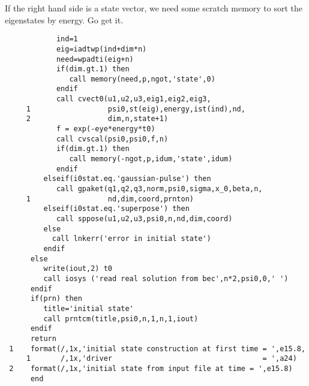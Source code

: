 \documentclass{article}
\begin{document}
        If the right hand side is a state vector, we need some scratch
        memory to sort the eigenstates by energy.  Go get it.
\begin{verbatim}
            ind=1
            eig=iadtwp(ind+dim*n)
            need=wpadti(eig+n)
            if(dim.gt.1) then
               call memory(need,p,ngot,'state',0)
            endif
            call cvect0(u1,u2,u3,eig1,eig2,eig3,
     1                  psi0,st(eig),energy,ist(ind),nd,
     2                  dim,n,state+1)
            f = exp(-eye*energy*t0)
            call cvscal(psi0,psi0,f,n)
            if(dim.gt.1) then
               call memory(-ngot,p,idum,'state',idum)
            endif
         elseif(i0stat.eq.'gaussian-pulse') then
            call gpaket(q1,q2,q3,norm,psi0,sigma,x_0,beta,n,
     1                  nd,dim,coord,prnton)
         elseif(i0stat.eq.'superpose') then
            call sppose(u1,u2,u3,psi0,n,nd,dim,coord)
         else
           call lnkerr('error in initial state')
         endif 
      else
         write(iout,2) t0
         call iosys ('read real solution from bec',n*2,psi0,0,' ')
      endif
      if(prn) then
         title='initial state'
         call prntcm(title,psi0,n,1,n,1,iout)
      endif
      return
 1    format(/,1x,'initial state construction at first time = ',e15.8,
     1       /,1x,'driver                                   = ',a24)
 2    format(/,1x,'initial state from input file at time = ',e15.8)
      end       
\end{verbatim}
\end{document}
